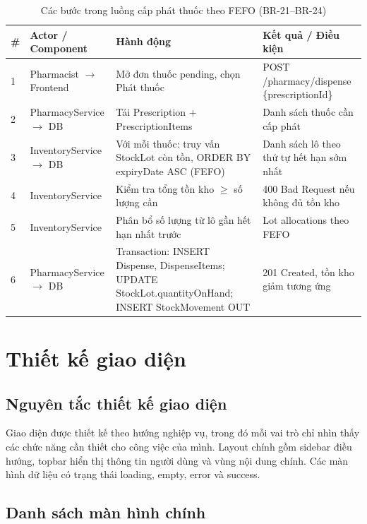 \begin{longtable}{|p{0.5cm}|p{3.2cm}|p{5.5cm}|p{4.6cm}|}
\caption{Các bước trong luồng cấp phát thuốc theo FEFO (BR-21--BR-24)}\label{tab:fefo-sequence}\\
\hline
\textbf{\#} & \textbf{Actor / Component} & \textbf{Hành động} & \textbf{Kết quả / Điều kiện} \\
\hline
1 & Pharmacist $\rightarrow$ Frontend & Mở đơn thuốc pending, chọn Phát thuốc & POST /pharmacy/dispense \{prescriptionId\} \\
\hline
2 & PharmacyService $\rightarrow$ DB & Tải Prescription + PrescriptionItems & Danh sách thuốc cần cấp phát \\
\hline
3 & InventoryService $\rightarrow$ DB & Với mỗi thuốc: truy vấn StockLot còn tồn, ORDER BY expiryDate ASC (FEFO) & Danh sách lô theo thứ tự hết hạn sớm nhất \\
\hline
4 & InventoryService & Kiểm tra tổng tồn kho $\geq$ số lượng cần & 400 Bad Request nếu không đủ tồn kho \\
\hline
5 & InventoryService & Phân bổ số lượng từ lô gần hết hạn nhất trước & Lot allocations theo FEFO \\
\hline
6 & PharmacyService $\rightarrow$ DB & Transaction: INSERT Dispense, DispenseItems; UPDATE StockLot.quantityOnHand; INSERT StockMovement OUT & 201 Created, tồn kho giảm tương ứng \\
\hline
\end{longtable}

\section{Thiết kế giao diện}

\subsection{Nguyên tắc thiết kế giao diện}

Giao diện được thiết kế theo hướng nghiệp vụ, trong đó mỗi vai trò chỉ nhìn thấy các chức năng cần thiết cho công việc của mình. Layout chính gồm sidebar điều hướng, topbar hiển thị thông tin người dùng và vùng nội dung chính. Các màn hình dữ liệu có trạng thái loading, empty, error và success.

\subsection{Danh sách màn hình chính}

